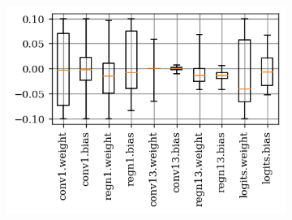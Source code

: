 \begin{figure}[t]
\begin{subfigure}{0.35\textwidth}
		\includegraphics[width=1\textwidth]{c10_weights_q801auunrfp_nt.png}
	\end{subfigure}
	\begin{subfigure}{0.35\textwidth}
		\vspace*{0px}
		\centering
		\Clipping[$0.05$]
			

\end{subfigure}
\end{figure}
